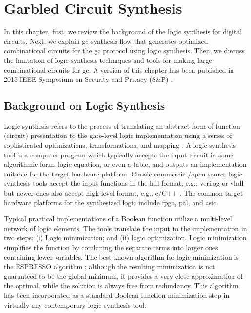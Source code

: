\chapter{Garbled Circuit Synthesis}\label{chap:syn}
In this chapter, first, we review the background of the logic synthesis for digital circuits.
Next, we explain \acrfull{gc} synthesis flow that generates optimized combinational circuits for the \acrshort{gc} protocol using logic synthesis.
Then, we discuss the limitation of logic synthesis techniques and tools for making large combinational circuits for \acrshort{gc}.
A version of this chapter has been published in 2015 IEEE Symposium on Security and Privacy (S\&P) \cite{songhori2015tinygarble}.

\section{Background on Logic Synthesis}\label{sec:syn-back}
Logic synthesis refers to the process of translating an abstract form of function (circuit) presentation to the gate-level logic implementation using a series of sophisticated optimizations, transformations, and mapping \cite{sentovich1992sis,micheli1994synthesis,devadas1994logic,brayton1987mis}.
A logic synthesis tool is a computer program which typically accepts the input circuit in some algorithmic form, logic equation, or even a table, and outputs an implementation suitable for the target hardware platform.
Classic commercial/open-source logic synthesis tools accept the input functions in the \acrfull{hdl} format, e.g., \gls{verilog} or \gls{vhdl} \cite{tool:DesignCompiler,tool:ABC,tool:Encounter,tool:HDLdesigner,tool:PandA,decaluwe2004myhdl} but newer ones also accept high-level format, e.g., \gls{c}/C++ \cite{Gupta2004, tool:Vivado}.
The common target hardware platforms for the synthesized logic include \acrfull{fpga}, \acrfull{pal}, and \acrfull{asic}.

Typical practical implementations of a Boolean function utilize a multi-level network of logic elements.
The tools translate the input to the implementation in two steps: (i) Logic minimization; and (ii) logic optimization.
Logic minimization simplifies the function by combining the separate terms into larger ones containing fewer variables.
The best-known algorithm for logic minimization is the ESPRESSO algorithm \cite{brayton1984logic}; although the resulting minimization is not guaranteed to be the global minimum, it provides a very close approximation of the optimal, while the solution is always free from redundancy.
This algorithm has been incorporated as a standard Boolean function minimization step in virtually any contemporary logic synthesis tool.

